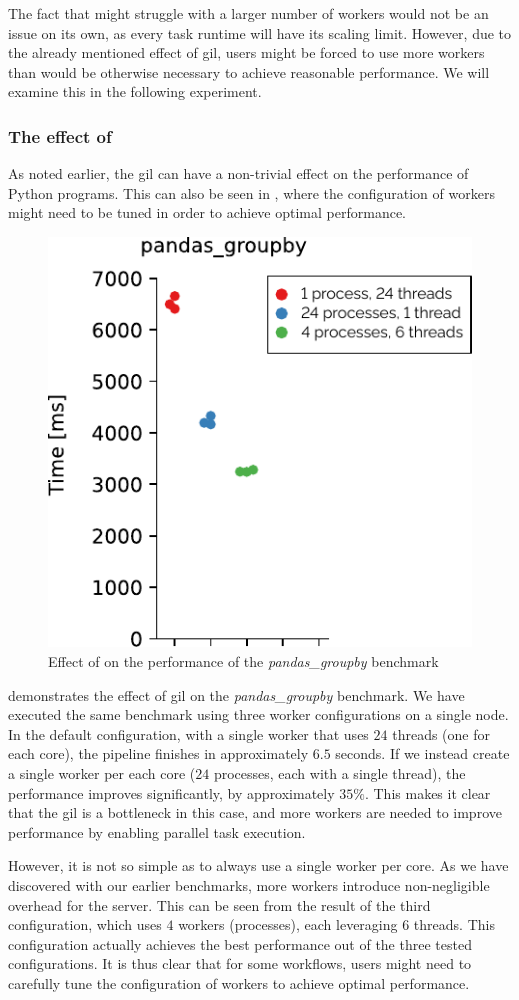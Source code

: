 The fact that \dask{} might struggle with a larger number of workers would not
be an issue on its own, as every task runtime will have its scaling limit. However, due to the
already mentioned effect of \gls{gil}, \dask{} users might be
forced to use more workers than would be otherwise necessary to achieve reasonable performance. We
will examine this in the following experiment.

\subsubsection*{The effect of }
As noted earlier, the \gls{gil} can have a non-trivial effect on the performance
of Python programs. This can also be seen in \dask{}, where the configuration
of workers might need to be tuned in order to achieve optimal performance.

\begin{figure}
	\centering
	\includegraphics[width=0.3\linewidth]{./imgs/rsds/charts/dask-gil-scaling}
	\caption{Effect of  on the performance of the \emph{pandas\_groupby} benchmark}
	\label{fig:dask-gil-scaling}
\end{figure}

 demonstrates the effect of \gls{gil} on the
\emph{pandas\_groupby} benchmark. We have executed the same benchmark using three
\dask{} worker configurations on a single node. In the default configuration,
with a single worker that uses $24$ threads (one for each core), the pipeline
finishes in approximately $6.5$ seconds. If we instead create a single worker
per each core ($24$ processes, each with a single thread), the performance
improves significantly, by approximately $35\%$. This makes it clear that the
\gls{gil} is a bottleneck in this case, and more \dask{}
workers are needed to improve performance by enabling parallel task execution.

However, it is not so simple as to always use a single \dask{} worker per core.
As we have discovered with our earlier benchmarks, more workers introduce non-negligible overhead
for the \dask{} server. This can be seen from the result of the third
configuration, which uses $4$ \dask{} workers
(processes), each leveraging $6$ threads. This configuration actually
achieves the best performance out of the three tested configurations. It is thus clear that for
some \dask{} workflows, users might need to carefully tune the configuration of
workers to achieve optimal performance.

